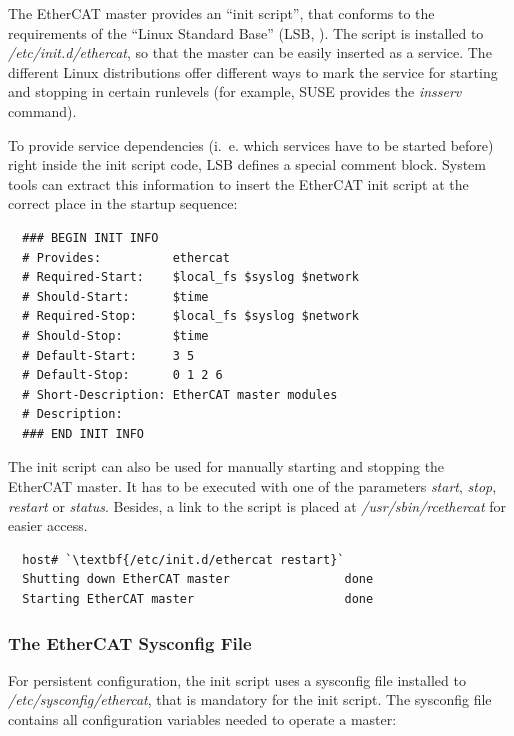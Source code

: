 \documentclass[a4paper,12pt,BCOR6mm,bibtotoc,idxtotoc]{scrbook}
\begin{document}
The EtherCAT master provides an ``init script'', that conforms to the
requirements of the ``Linux Standard Base'' (LSB,
\cite{lsb}). The script is installed to \textit{/etc/init.d/ethercat},
so that the master can be easily inserted as a service. The different
Linux distributions offer different ways to mark the service for
starting and stopping in certain runlevels (for example, SUSE provides
the \textit{insserv} command).

To provide service dependencies (i.~e. which services have to be
started before) right inside the init script code, LSB defines a
special comment block. System tools can extract this information to
insert the EtherCAT init script at the correct place in the startup
sequence:

\begin{lstlisting}
  ### BEGIN INIT INFO
  # Provides:          ethercat
  # Required-Start:    $local_fs $syslog $network
  # Should-Start:      $time
  # Required-Stop:     $local_fs $syslog $network
  # Should-Stop:       $time
  # Default-Start:     3 5
  # Default-Stop:      0 1 2 6
  # Short-Description: EtherCAT master modules
  # Description:
  ### END INIT INFO
\end{lstlisting}

The init script can also be used for manually starting and stopping
the EtherCAT master. It has to be executed with one of the parameters
\textit{start}, \textit{stop}, \textit{restart} or \textit{status}.
Besides, a link to the script is placed at
\textit{/usr/sbin/rcethercat} for easier access.

\begin{lstlisting}
  host# `\textbf{/etc/init.d/ethercat restart}`
  Shutting down EtherCAT master                done
  Starting EtherCAT master                     done
\end{lstlisting}

\subsubsection{The EtherCAT Sysconfig File}
\label{sec:sysconfig}

For persistent configuration, the init script uses a sysconfig file
installed to \textit{/etc/sys\-config/ethercat}, that is mandatory for
the init script. The sysconfig file contains all configuration
variables needed to operate a master:
\end{document}
